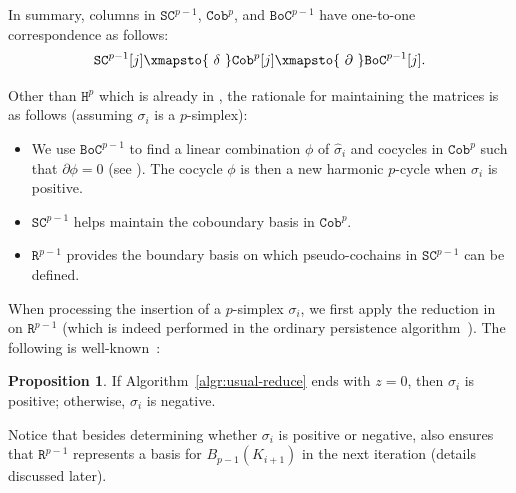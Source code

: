 \documentclass[10pt,a4paper]{amsart}
\newcommand{\para}[1]{\vspace{2mm}\noindent{\textbf{\sffamily{#1}}}\hspace{4pt}}
\theoremstyle{definition}
\newcommand{\Tao}[1]{{\color{magenta}[#1]}}
\newcommand{\filt}{F}
\newcommand{\fsimp}{\sigma}
\newcommand{\lbarrowspace}{\;}
\newcommand{\inctosp}[1]{\xhookrightarrow{\lbarrowspace#1\lbarrowspace}}
\newcommand{\Bnd}{B}
\newcommand{\Real}{\mathbb{R}}
\newcommand{\Cobmat}{\mathtt{Cob}}
\newcommand{\Chnmat}{\mathtt{SC}}
\newcommand{\Bndmat}{\mathtt{BoC}}
\newcommand{\Harmat}{\mathtt{H}}
\newcommand{\Rmat}{\mathtt{R}}
\newcommand{\sG}{\sigma}
\newcommand{\dG}{\delta}
\newtheorem{proposition}[theorem]{Proposition}
\theoremstyle{remark}
\newtheorem{remark}[theorem]{Remark}
\begin{document}
In summary,
columns in   $\Chnmat^{p-1}$, $\Cobmat^{p}$,  and  $\Bndmat^{p-1}$
have one-to-one correspondence
as follows:
\[
\Chnmat^{p-1}[j]\xmapsto{\ \dG\ }\Cobmat^{p}[j]\xmapsto{\ \partial\ }\Bndmat^{p-1}[j].\]

Other than $\Harmat^p$ which is already in ,
the rationale for maintaining the matrices is as follows
(assuming $\fsimp_i$ is a $p$-simplex):
\begin{itemize}
    \item We use $\Bndmat^{p-1}$ to find a linear combination $\phi$
    of  $\hat{\fsimp}_i$ and cocycles in $\Cobmat^{p}$ 
    such that $\partial\phi=0$
    (see ).
    The cocycle $\phi$ 
    is then a new harmonic $p$-cycle when $\fsimp_i$ is positive.
    \item 
    $\Chnmat^{p-1}$ helps maintain the coboundary basis in $\Cobmat^{p}$.
    \item
     $\Rmat^{p-1}$ provides the boundary basis on which 
    pseudo-cochains in $\Chnmat^{p-1}$ can be defined.
\end{itemize}



\para{Initial reduction.}
When processing the
insertion of 
a $p$-simplex $\fsimp_i$,
we first apply the  reduction  
in 
on $\Rmat^{p-1}$
(which is indeed 
performed in the ordinary persistence algorithm~\cite{EdelsbrunnerLetscherZomorodian2002}).
The following
is  well-known~\cite{DeyWang2022,EdelsbrunnerLetscherZomorodian2002}:
\begin{proposition}
\label{prop:usual-reduce}
If 
Algorithm~\ref{algr:usual-reduce} ends with $z=0$,
then $\fsimp_i$ is positive;
otherwise, $\fsimp_i$ is negative.
\end{proposition}
Notice that besides determining whether $\fsimp_i$ is positive or negative,
also ensures that $\Rmat^{p-1}$ represents a basis for $\Bnd_{p-1}(K_{i+1})$
in the next iteration
(details discussed later).
\end{document}
